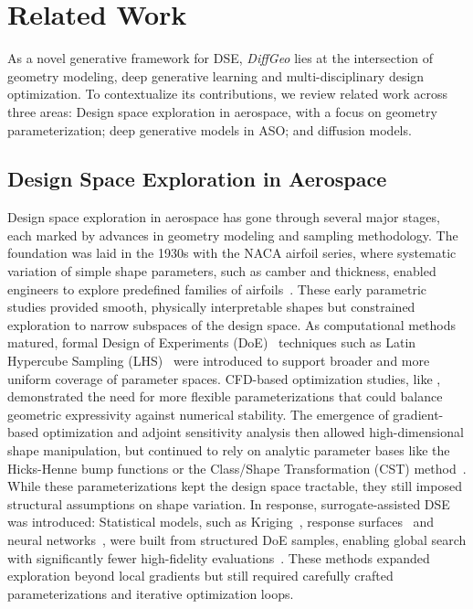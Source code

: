 \section{Related Work}
\label{ch6:sec:related_work}

As a novel generative framework for DSE, \textit{DiffGeo} lies at the intersection of geometry modeling, deep generative learning and multi-disciplinary design optimization. To contextualize its contributions, we review related work across three areas: Design space exploration in aerospace, with a focus on geometry parameterization; deep generative models in ASO; and diffusion models.

\subsection{Design Space Exploration in Aerospace}
Design space exploration in aerospace has gone through several major stages, each marked by advances in geometry modeling and sampling methodology. The foundation was laid in the 1930s with the NACA airfoil series, where systematic variation of simple shape parameters, such as camber and thickness, enabled engineers to explore predefined families of airfoils~\cite{aa.Jacobs1933}. These early parametric studies provided smooth, physically interpretable shapes but constrained exploration to narrow subspaces of the design space. As computational methods matured, formal Design of Experiments (DoE)~\cite{aa.Fisher1935} techniques such as Latin Hypercube Sampling (LHS)~\cite{ai.McKay1979} were introduced to support broader and more uniform coverage of parameter spaces. CFD-based optimization studies, like \citet{aa.Hicks1978}, demonstrated the need for more flexible parameterizations that could balance geometric expressivity against numerical stability. The emergence of gradient-based optimization and adjoint sensitivity analysis then allowed high-dimensional shape manipulation, but continued to rely on analytic parameter bases like the Hicks-Henne bump functions or the Class/Shape Transformation (CST) method~\cite{aa.Kulfan2008}. While these parameterizations kept the design space tractable, they still imposed structural assumptions on shape variation. In response, surrogate-assisted DSE was introduced: Statistical models, such as Kriging~\cite{aa.Matheron1963}, response surfaces~\cite{aa.Box1951} and neural networks~\cite{ai.Rumelhart1986}, were built from structured DoE samples, enabling global search with significantly fewer high-fidelity evaluations~\cite{aa.Sacks1989, aa.Barthelemy1993}. These methods expanded exploration beyond local gradients but still required carefully crafted parameterizations and iterative optimization loops.

